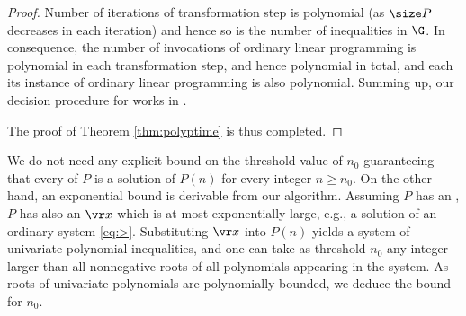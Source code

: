 \begin{proof}
Number of iterations of transformation step is polynomial (as $\size P$ decreases in each iteration) and hence
so is the number of inequalities in $\G$.
In consequence, the number of invocations of ordinary linear programming is polynomial in
each transformation step, and hence polynomial in total, and each its instance
of ordinary linear programming is also polynomial.
Summing up, our decision procedure for \allpolyineqsolvname works in \PTIME.

\smallskip
The proof of Theorem \ref{thm:polyptime} is thus completed.
%
\end{proof}

\begin{slremark}
We do not need any explicit bound on the threshold value of $n_0$ guaranteeing that 
every \aasol of $P$ is a solution of $P(n)$ for every integer $n \geq n_0$.
On the other hand, an exponential bound is derivable from our algorithm.
Assuming $P$ has an \aasol, $P$ has also an \aasol $\vr x$ which is at most exponentially large, 
e.g., a solution of an ordinary system \eqref{eq:>}.
Substituting $\vr x$ into $P(n)$ yields a system of univariate polynomial inequalities, and 
one can take as threshold $n_0$ any integer larger than all nonnegative roots of all polynomials appearing
in the system. 
As roots of univariate polynomials are polynomially bounded, we deduce the bound for $n_0$.
\end{slremark}

